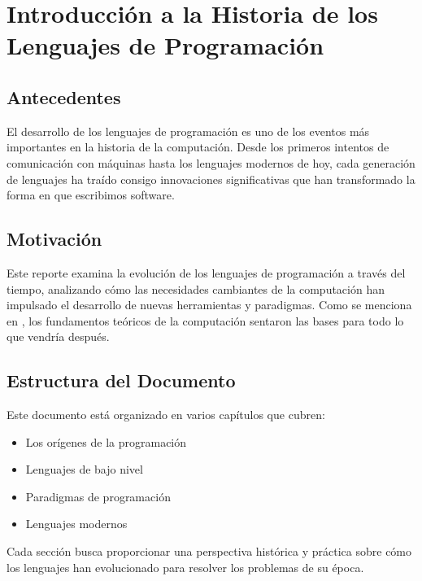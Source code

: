 \chapter{Introducción a la Historia de los Lenguajes de Programación}

\section{Antecedentes}

El desarrollo de los lenguajes de programación es uno de los eventos más importantes en la historia de la computación. 
Desde los primeros intentos de comunicación con máquinas hasta los lenguajes modernos de hoy, cada generación de 
lenguajes ha traído consigo innovaciones significativas que han transformado la forma en que escribimos software.

\section{Motivación}

Este reporte examina la evolución de los lenguajes de programación a través del tiempo, analizando cómo las necesidades 
cambiantes de la computación han impulsado el desarrollo de nuevas herramientas y paradigmas. Como se menciona en \cite{Turing1936}, 
los fundamentos teóricos de la computación sentaron las bases para todo lo que vendría después.

\section{Estructura del Documento}

Este documento está organizado en varios capítulos que cubren:
\begin{itemize}
    \item Los orígenes de la programación
    \item Lenguajes de bajo nivel
    \item Paradigmas de programación
    \item Lenguajes modernos
\end{itemize}

Cada sección busca proporcionar una perspectiva histórica y práctica sobre cómo los lenguajes han evolucionado 
para resolver los problemas de su época.
